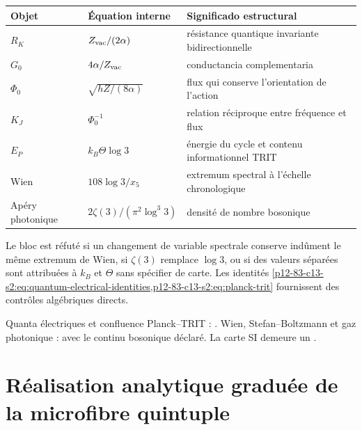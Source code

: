 \begin{longtable}{@{}p{}p{}p{}@{}}
\toprule
Objet & Équation interne & Significado estructural\\
\midrule
\endhead
\(R_K\) & \(Z_{\rm vac}/(2\alpha)\) & résistance quantique invariante bidirectionnelle\\
\(G_0\) & \(4\alpha/Z_{\rm vac}\) & conductancia complementaria\\
\(\Phi_0\) & \(\sqrt{hZ/(8\alpha)}\) & flux qui conserve l'orientation de l'action\\
\(K_J\) & \(\Phi_0^{-1}\) & relation réciproque entre fréquence et flux\\
\(E_P\) & \(k_B\Theta\log3\) & énergie du cycle et contenu informationnel TRIT\\
Wien & \(108\log3/x_5\) & extremum spectral à l'échelle chronologique\\
Apéry photonique & \(2\zeta(3)/(\pi^2\log^3 3)\) & densité de nombre bosonique\\
\bottomrule
\end{longtable}

\begin{falsifier}
Le bloc est réfuté si un changement de variable spectrale conserve
indûment le même extremum de Wien, si \(\zeta(3)\) remplace
\(\log3\), ou si des valeurs séparées sont attribuées à \(k_B\) et \(\Theta\) sans
spécifier de carte. Les identités
\cref{p12-83-c13-s2:eq:quantum-electrical-identities,p12-83-c13-s2:eq:planck-trit} fournissent des contrôles
algébriques directs.
\end{falsifier}

\begin{statusbox}
Quanta électriques et confluence Planck--TRIT : . Wien, Stefan--Boltzmann et gaz photonique :  avec le continu bosonique déclaré. La carte SI demeure un .
\end{statusbox}


\section{Réalisation analytique graduée de la microfibre quintuple}
\label{p12-83-c13-s3:chap:realizacion-analitica-contraangulo}


